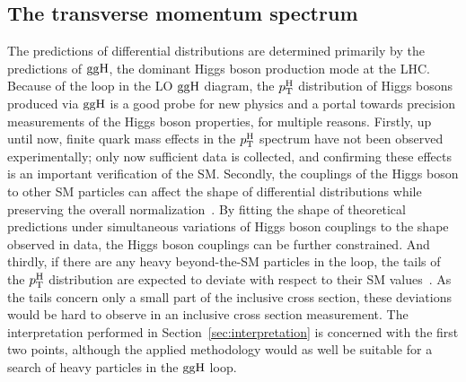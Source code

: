 \subsection{The transverse momentum spectrum}
\label{sec:theory-pt}

The predictions of differential distributions are determined primarily by the predictions of $\mathrm{g}\mathrm{g}\mathrm{H}$, the dominant Higgs boson production mode at the LHC.
% 
Because of the loop in the LO $\mathrm{g}\mathrm{g}\mathrm{H}$ diagram, the $p_\mathrm{T}^\mathrm{H}$ distribution of Higgs bosons produced via $\mathrm{g}\mathrm{g}\mathrm{H}$ is a good probe for new physics and a portal towards precision measurements of the Higgs boson properties, for multiple reasons.
% 
Firstly, up until now, finite quark mass effects in the $p_\mathrm{T}^\mathrm{H}$ spectrum have not been observed experimentally; only now sufficient data is collected, and confirming these effects is an important verification of the SM.
% 
Secondly, the couplings of the Higgs boson to other SM particles can affect the shape of differential distributions while preserving the overall normalization~\cite{Bishara:2016jga,Grazzini:2017szg,Grazzini:2016paz}.
% 
By fitting the shape of theoretical predictions under simultaneous variations of Higgs boson couplings to the shape observed in data, the Higgs boson couplings can be further constrained.
% 
And thirdly, if there are any heavy beyond-the-SM particles in the loop, the tails of the $p_\mathrm{T}^\mathrm{H}$ distribution are expected to deviate with respect to their SM values~\cite{Banfi:2013yoa}.
% 
As the tails concern only a small part of the inclusive cross section, these deviations would be hard to observe in an inclusive cross section measurement.
% 
The interpretation performed in Section~\ref{sec:interpretation} is concerned with the first two points, although the applied methodology would as well be suitable for a search of heavy particles in the $\mathrm{g}\mathrm{g}\mathrm{H}$ loop.


